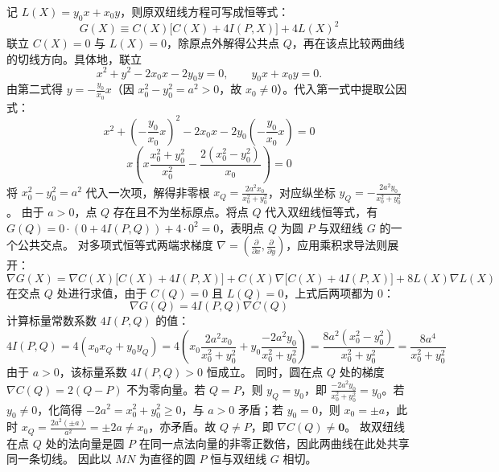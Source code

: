 \begin{solution}
记 $L(X) = y_0 x + x_0 y$，则原双纽线方程可写成恒等式：
\[ G(X) \equiv C(X) \big[ C(X) + 4I(P,X) \big] + 4L(X)^2 \]
联立 $C(X)=0$ 与 $L(X)=0$，除原点外解得公共点 $Q$，再在该点比较两曲线的切线方向。具体地，联立
\[
x^2 + y^2 - 2x_0 x - 2y_0 y = 0,\qquad y_0 x + x_0 y = 0.
\]
由第二式得 $y = -\frac{y_0}{x_0}x$（因 $x_0^2 - y_0^2 = a^2 > 0$，故 $x_0 \neq 0$）。代入第一式中提取公因式：
\[ x^2 + \left(-\frac{y_0}{x_0}x\right)^2 - 2x_0 x - 2y_0\left(-\frac{y_0}{x_0}x\right) = 0 \]
\[ x \left( x\frac{x_0^2 + y_0^2}{x_0^2} - \frac{2(x_0^2 - y_0^2)}{x_0} \right) = 0 \]
将 $x_0^2 - y_0^2 = a^2$ 代入一次项，解得非零根 $x_Q = \frac{2a^2 x_0}{x_0^2 + y_0^2}$，对应纵坐标 $y_Q = -\frac{2a^2 y_0}{x_0^2 + y_0^2}$。
由于 $a > 0$，点 $Q$ 存在且不为坐标原点。将点 $Q$ 代入双纽线恒等式，有 $G(Q) = 0 \cdot (0 + 4I(P,Q)) + 4 \cdot 0^2 = 0$，表明点 $Q$ 为圆 $P$ 与双纽线 $G$ 的一个公共交点。
对多项式恒等式两端求梯度 $\nabla = \left(\frac{\partial}{\partial x}, \frac{\partial}{\partial y}\right)$，应用乘积求导法则展开：
\[ \nabla G(X) = \nabla C(X) \big[ C(X) + 4I(P,X) \big] + C(X) \nabla \big[ C(X) + 4I(P,X) \big] + 8 L(X) \nabla L(X) \]
在交点 $Q$ 处进行求值，由于 $C(Q) = 0$ 且 $L(Q) = 0$，上式后两项都为 $0$：
\[ \nabla G(Q) = 4I(P,Q) \nabla C(Q) \]
计算标量常数系数 $4I(P,Q)$ 的值：
\[ 4I(P,Q) = 4(x_0 x_Q + y_0 y_Q) = 4 \left( x_0 \frac{2a^2 x_0}{x_0^2 + y_0^2} + y_0 \frac{-2a^2 y_0}{x_0^2 + y_0^2} \right) = \frac{8a^2(x_0^2 - y_0^2)}{x_0^2 + y_0^2} = \frac{8a^4}{x_0^2 + y_0^2} \]
由于 $a > 0$，该标量系数 $4I(P,Q) > 0$ 恒成立。
同时，圆在点 $Q$ 处的梯度 $\nabla C(Q) = 2(Q - P)$ 不为零向量。若 $Q = P$，则 $y_Q = y_0$，即 $\frac{-2a^2 y_0}{x_0^2 + y_0^2} = y_0$。若 $y_0 \neq 0$，化简得 $-2a^2 = x_0^2 + y_0^2 \ge 0$，与 $a>0$ 矛盾；若 $y_0 = 0$，则 $x_0 = \pm a$，此时 $x_Q = \frac{2a^2(\pm a)}{a^2} = \pm 2a \neq x_0$，亦矛盾。故 $Q \neq P$，即 $\nabla C(Q) \neq \mathbf{0}$。
故双纽线在点 $Q$ 处的法向量是圆 $P$ 在同一点法向量的非零正数倍，因此两曲线在此处共享同一条切线。
因此以 $MN$ 为直径的圆 $P$ 恒与双纽线 $G$ 相切。
\end{solution}



